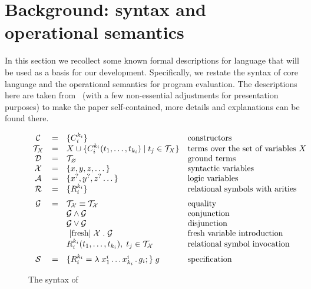 \section{Background: syntax and operational semantics}
\label{sec:background}


In this section we recollect some known formal descriptions for \mK language that will be used as a basis for our development.
Specifically, we restate the syntax of core language and the operational semantics for program evaluation.
The descriptions here are taken from~\cite{CertifiedSemantics} (with a few non-essential adjustments for presentation purposes) to make
the paper self-contained, more details and explanations can be found there.

\begin{figure}[t]
\centering
\[
\begin{array}{ccll}
  \mathcal{C} & = & \{C_i^{k_i}\} & \mbox{constructors} \\
  \mathcal{T}_X & = & X \cup \{C_i^{k_i} (t_1, \dots, t_{k_i}) \mid t_j\in\mathcal{T}_X\} & \mbox{terms over the set of variables $X$} \\
  \mathcal{D} & = & \mathcal{T}_\emptyset & \mbox{ground terms}\\
  \mathcal{X} & = & \{ x, y, z, \dots \} & \mbox{syntactic variables} \\
  \mathcal{A} & = & \{ x^?, y^?, z^? \dots \} & \mbox{logic variables} \\
  \mathcal{R} & = & \{ R_i^{k_i}\} &\mbox{relational symbols with arities} \\[2mm]
  \mathcal{G} & = & \mathcal{T_X}\equiv\mathcal{T_X}   &  \mbox{equality} \\
              &   & \mathcal{G}\wedge\mathcal{G}     & \mbox{conjunction} \\
              &   & \mathcal{G}\vee\mathcal{G}       &\mbox{disjunction} \\
              &   & \mbox{\lstinline|fresh|}\;\mathcal{X}\;.\;\mathcal{G} & \mbox{fresh variable introduction} \\
              &   & R_i^{k_i} (t_1,\dots,t_{k_i}),\;t_j\in\mathcal{T_X} & \mbox{relational symbol invocation} \\[2mm]
  \mathcal{S} & = & \{R_i^{k_i} = \lambda\;x_1^i\dots x_{k_i}^i\,.\, g_i;\}\; g & \mbox{specification}
\end{array}
\]
\caption{The syntax of \mK}
\label{fig:syntax}
\end{figure}

